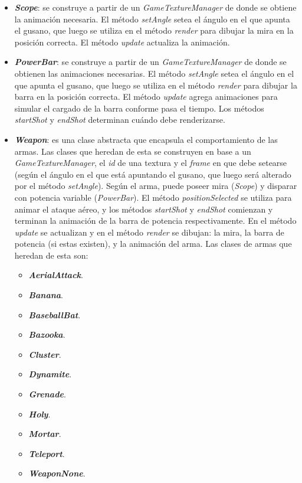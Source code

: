 \begin{itemize}
	\item \textbf{\textit{Scope}}: se construye a partir de un \textit{GameTextureManager} de donde se obtiene la animación necesaria. El método \textit{setAngle} setea el ángulo en el que apunta el gusano, que luego se utiliza en el método \textit{render} para dibujar la mira en la posición correcta. El método \textit{update} actualiza la animación.
	
	\item \textbf{\textit{PowerBar}}: se construye a partir de un \textit{GameTextureManager} de donde se obtienen las animaciones necesarias. El método \textit{setAngle} setea el ángulo en el que apunta el gusano, que luego se utiliza en el método \textit{render} para dibujar la barra en la posición correcta. El método \textit{update} agrega animaciones para simular el cargado de la barra conforme pasa el tiempo. Los métodos \textit{startShot} y \textit{endShot} determinan cuándo debe renderizarse.
	
	\item \textbf{\textit{Weapon}}: es una clase abstracta que encapsula el comportamiento de las armas. Las clases que heredan de esta se construyen en base a un \textit{GameTextureManager}, el \textit{id} de una textura y el \textit{frame} en que debe setearse (según el ángulo en el que está apuntando el gusano, que luego será alterado por el método \textit{setAngle}). Según el arma, puede poseer mira (\textit{Scope}) y disparar con potencia variable (\textit{PowerBar}). El método \textit{positionSelected} se utiliza para animar el ataque aéreo, y los métodos \textit{startShot} y \textit{endShot} comienzan y terminan la animación de la barra de potencia respectivamente. En el método \textit{update} se actualizan y en el método \textit{render} se dibujan: la mira, la barra de potencia (si estas existen), y la animación del arma. Las clases de armas que heredan de esta son:
	\begin{itemize}
		\item \textbf{\textit{AerialAttack}}.
		\item \textbf{\textit{Banana}}.
		\item \textbf{\textit{BaseballBat}}.
		\item \textbf{\textit{Bazooka}}.
		\item \textbf{\textit{Cluster}}.
		\item \textbf{\textit{Dynamite}}.
		\item \textbf{\textit{Grenade}}.
		\item \textbf{\textit{Holy}}.
		\item \textbf{\textit{Mortar}}.
		\item \textbf{\textit{Teleport}}.
		\item \textbf{\textit{WeaponNone}}.
	\end{itemize}


\end{itemize}
